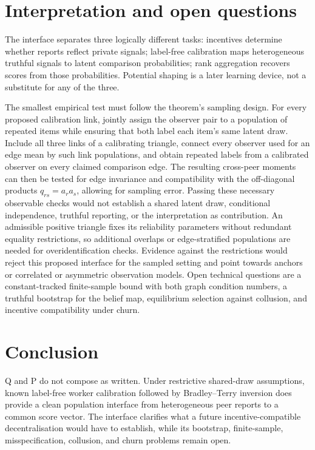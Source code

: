 \documentclass{article}
\begin{document}
\section{Interpretation and open questions}

The interface separates three logically different tasks: incentives determine whether reports reflect private signals; label-free calibration maps heterogeneous truthful signals to latent comparison probabilities; rank aggregation recovers scores from those probabilities.  Potential shaping is a later learning device, not a substitute for any of the three. %

The smallest empirical test must follow the theorem's sampling design.  For every proposed calibration link, jointly assign the observer pair to a population of repeated items while ensuring that both label each item's same latent draw.  Include all three links of a calibrating triangle, connect every observer used for an edge mean by such link populations, and obtain repeated labels from a calibrated observer on every claimed comparison edge.  The resulting cross-peer moments can then be tested for edge invariance and compatibility with the off-diagonal products \(q_{rs}=a_ra_s\), allowing for sampling error.  Passing these necessary observable checks would not establish a shared latent draw, conditional independence, truthful reporting, or the interpretation as contribution.  An admissible positive triangle fixes its reliability parameters without redundant equality restrictions, so additional overlaps or edge-stratified populations are needed for overidentification checks.  Evidence against the restrictions would reject this proposed interface for the sampled setting and point towards anchors or correlated or asymmetric observation models. %
Open technical questions are a constant-tracked finite-sample bound with both graph condition numbers, a truthful bootstrap for the belief map, equilibrium selection against collusion, and incentive compatibility under churn. %

\section{Conclusion}

Q and P do not compose as written.  Under restrictive shared-draw assumptions, known label-free worker calibration followed by Bradley--Terry inversion does provide a clean population interface from heterogeneous peer reports to a common score vector. %
The interface clarifies what a future incentive-compatible decentralisation would have to establish, while its bootstrap, finite-sample, misspecification, collusion, and churn problems remain open. %



\end{document}
